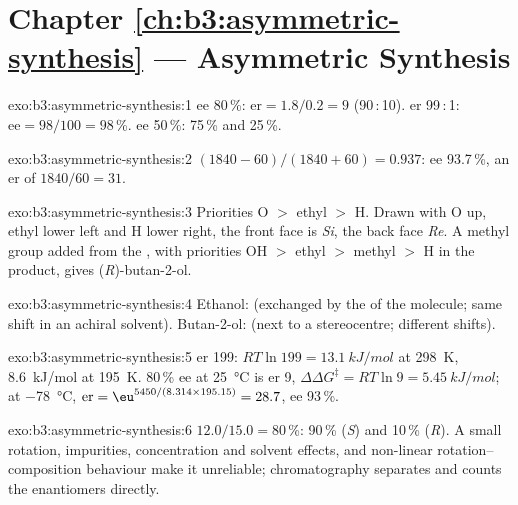 \section*{Chapter \ref{ch:b3:asymmetric-synthesis} --- Asymmetric Synthesis}

\begin{solution}{exo:b3:asymmetric-synthesis:1}
ee 80\,\%: $\mathrm{er} = 1.8/0.2 = 9$ (90\,:\,10). er 99\,:\,1: $\mathrm{ee} = 98/100 = 98$\,\%. ee 50\,\%: 75\,\% and 25\,\%.
\end{solution}

\begin{solution}{exo:b3:asymmetric-synthesis:2}
$(1840 - 60)/(1840 + 60) = 0.937$: ee 93.7\,\%, an er of $1840/60 = 31$.
\end{solution}

\begin{solution}{exo:b3:asymmetric-synthesis:3}
Priorities O $>$ ethyl $>$ H. Drawn with O up, ethyl lower left and H lower right, the
front face is \textit{Si}, the back face \textit{Re}. A methyl group added from the , with
priorities OH $>$ ethyl $>$ methyl $>$ H in the product, gives (\textit{R})-butan-2-ol.
\end{solution}

\begin{solution}{exo:b3:asymmetric-synthesis:4}
Ethanol:  (exchanged by the  of the molecule; same
shift in an achiral solvent). Butan-2-ol:  (next to a stereocentre;
different shifts).
\end{solution}

\begin{solution}{exo:b3:asymmetric-synthesis:5}
er 199: $RT\ln 199 = \qty{13.1}{kJ/mol}$ at \qty{298}{K}, \qty{8.6}{kJ/mol} at \qty{195}{K}. 80\,\% ee at \qty{25}{\celsius} is er 9,
$\Delta\Delta G^\ddagger = RT\ln 9 = \qty{5.45}{kJ/mol}$; at \qty{-78}{\celsius}, $\mathrm{er} = \eu^{5450/(8.314 \times 195.15)} = 28.7$, ee 93\,\%.
\end{solution}

\begin{solution}{exo:b3:asymmetric-synthesis:6}
 $12.0/15.0 = 80$\,\%: 90\,\% (\textit{S}) and 10\,\% (\textit{R}). A small rotation, impurities,
concentration and solvent effects, and non-linear rotation--composition
behaviour make it unreliable; chromatography separates and counts the
enantiomers directly.
\end{solution}

